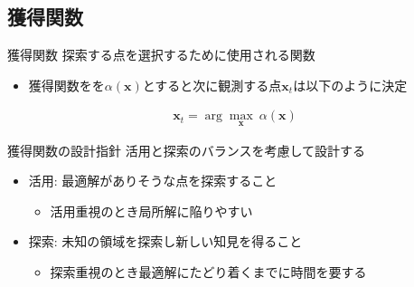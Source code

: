 \documentclass[dvipdfmx, 10.5pt]{beamer}
\begin{document}
\subsection{獲得関数}
\begin{frame}{\insertsubsection}
	\begin{block}{獲得関数}
		探索する点を選択するために使用される関数 %
	\end{block}
	\begin{itemize}
		\item 獲得関数をを$\alpha(\bm x)$とすると次に観測する点$\bm x_t$は以下のように決定
	\end{itemize}
	\begin{align*}
		\bm x_t = \arg \max_{\bm x} ~ \alpha(\bm x)
	\end{align*}
	\begin{block}{獲得関数の設計指針}
		\textcolor{myorange}{活用と探索のバランス}を考慮して設計する
	\end{block}
	\begin{itemize}
		\item 活用: 最適解がありそうな点を探索すること
		\begin{itemize}
			\item 活用重視のとき局所解に陥りやすい
		\end{itemize}
		\vspace{3pt}
		\item 探索: 未知の領域を探索し新しい知見を得ること
		\begin{itemize}
			\item 探索重視のとき最適解にたどり着くまでに時間を要する
		\end{itemize}
	\end{itemize}

\end{frame}

\end{document}
